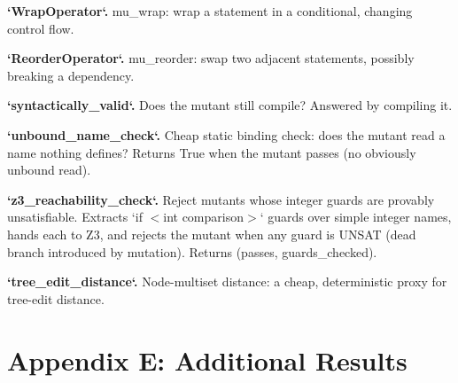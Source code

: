 \documentclass{article}
\begin{document}
\textbf{`WrapOperator`.} mu\_wrap: wrap a statement in a conditional, changing control flow.

\textbf{`ReorderOperator`.} mu\_reorder: swap two adjacent statements, possibly breaking a dependency.

\textbf{`syntactically\_valid`.} Does the mutant still compile? Answered by compiling it.

\textbf{`unbound\_name\_check`.} Cheap static binding check: does the mutant read a name nothing defines? Returns True when the mutant passes (no obviously unbound read).

\textbf{`z3\_reachability\_check`.} Reject mutants whose integer guards are provably unsatisfiable. Extracts `if $<$int comparison$>$` guards over simple integer names, hands each to Z3, and rejects the mutant when any guard is UNSAT (dead branch introduced by mutation). Returns (passes, guards\_checked).

\textbf{`tree\_edit\_distance`.} Node-multiset distance: a cheap, deterministic proxy for tree-edit distance.




\section{Appendix E: Additional Results}
\end{document}
